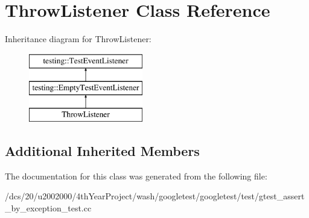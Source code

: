 \hypertarget{classThrowListener}{}\section{Throw\+Listener Class Reference}
\label{classThrowListener}
Inheritance diagram for Throw\+Listener\+:\begin{figure}[H]
\begin{center}
\leavevmode
\includegraphics[height=3.000000cm]{classThrowListener}
\end{center}
\end{figure}
\subsection*{Additional Inherited Members}


The documentation for this class was generated from the following file\+:\begin{DoxyCompactItemize}
\item 
/dcs/20/u2002000/4th\+Year\+Project/wash/googletest/googletest/test/gtest\+\_\+assert\+\_\+by\+\_\+exception\+\_\+test.\+cc\end{DoxyCompactItemize}
